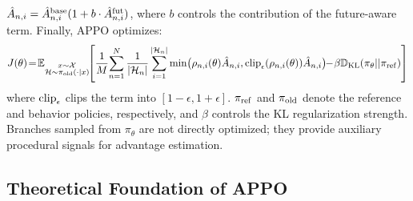 \documentclass{llmxive}
\begin{document}
$\hat{A}_{n,i}=\hat{A}^{\rm base}_{n,i}(1+b\cdot\hat{A}^{\rm fut}_{n,i})$,
where $b$ controls the contribution of the future-aware term. Finally, APPO optimizes:
\begin{equation}\label{eq:obj} 
    J(\theta)\!=\!\mathbb{E}_{\substack{x\sim\mathcal{X} \\  \mathcal{H}\sim\pi_{\rm old}(\cdot|x)}}\!\!\left[
    \frac{1}{M}\!\sum_{n=1}^N\frac{1}{|\mathcal{H}_n|}\sum_{i=1}^{|\mathcal{H}_n|}
    {\rm min}\big(\rho_{n,i}(\theta)\hat{A}_{n,i}, {\rm clip}_\epsilon(\rho_{n,i}(\theta))\hat{A}_{n,i}\big)
    \!\!-\!\beta\!\,\mathbb{D}_\mathrm{KL}(\pi_\theta||\pi_{\rm ref})
    \right]
\end{equation}
where ${\rm clip}_{\epsilon}$ clips the term into $[1-\epsilon, 1+\epsilon]$. $\pi_{\rm ref}$ and $\pi_{\rm old}$ denote the reference and behavior policies, respectively, and $\beta$ controls the KL regularization strength. Branches sampled from $\pi_\theta$ are not directly optimized; they provide auxiliary procedural signals for advantage estimation.

\subsection{Theoretical Foundation of APPO}
\end{document}
